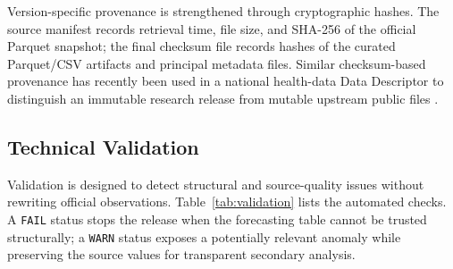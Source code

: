 \documentclass[data,datadescriptor,submit,moreauthors,pdftex]{Definitions/mdpi}
\begin{document}
Version-specific provenance is strengthened through cryptographic hashes. The source manifest records retrieval time, file size, and SHA-256 of the official Parquet snapshot; the final checksum file records hashes of the curated Parquet/CSV artifacts and principal metadata files. Similar checksum-based provenance has recently been used in a national health-data Data Descriptor to distinguish an immutable research release from mutable upstream public files \citep{Voinea2026}.

\subsection{Technical Validation}

Validation is designed to detect structural and source-quality issues without rewriting official observations. Table~\ref{tab:validation} lists the automated checks. A \texttt{FAIL} status stops the release when the forecasting table cannot be trusted structurally; a \texttt{WARN} status exposes a potentially relevant anomaly while preserving the source values for transparent secondary analysis.
\end{document}
